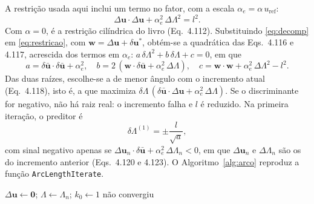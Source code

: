\documentclass[11pt,a4paper]{article}
\numberwithin{equation}{section}
\begin{document}
A restrição usada aqui inclui um termo no fator, com a escala $\alpha_e = \alpha\,u_{\mathrm{ref}}$:
\begin{equation}\label{eq:restricao}
\Delta\mathbf{u}\cdot\Delta\mathbf{u} + \alpha_e^2\,\Delta\Lambda^2 = l^2 .
\end{equation}
Com $\alpha = 0$, é a restrição cilíndrica do livro (Eq.~4.112). Substituindo \eqref{eq:decomp} em \eqref{eq:restricao}, com $\mathbf{w} = \Delta\mathbf{u} + \delta\mathbf{u}^{*}$, obtém-se a quadrática das Eqs.~4.116 e 4.117, acrescida dos termos em $\alpha_e$: $a\,\delta\Lambda^2 + b\,\delta\Lambda + c = 0$, em que
\begin{equation}
a = \delta\bar{\mathbf{u}}\cdot\delta\bar{\mathbf{u}} + \alpha_e^2,\quad
b = 2\,(\mathbf{w}\cdot\delta\bar{\mathbf{u}} + \alpha_e^2\,\Delta\Lambda),\quad
c = \mathbf{w}\cdot\mathbf{w} + \alpha_e^2\,\Delta\Lambda^2 - l^2 .
\end{equation}
Das duas raízes, escolhe-se a de menor ângulo com o incremento atual (Eq.~4.118), isto é, a que maximiza $\delta\Lambda\,(\delta\bar{\mathbf{u}}\cdot\Delta\mathbf{u} + \alpha_e^2\,\Delta\Lambda)$. Se o discriminante for negativo, não há raiz real: o incremento
falha e $l$ é reduzido. Na primeira iteração, o preditor é
\begin{equation}
\delta\Lambda^{(1)} = \pm\frac{l}{\sqrt{a}},
\end{equation}
com sinal negativo apenas se $\Delta\mathbf{u}_n\cdot\delta\bar{\mathbf{u}} + \alpha_e^2\,\Delta\Lambda_n < 0$, em que $\Delta\mathbf{u}_n$ e $\Delta\Lambda_n$ são os do incremento anterior (Eqs.~4.120 e 4.123). O Algoritmo~\ref{alg:arco} reproduz a função
\texttt{ArcLengthIterate}.

\begin{algorithm}[htbp]
\caption{Um incremento de arc-length (\texttt{ArcLengthIterate})}\label{alg:arco}
$\Delta\mathbf{u}\leftarrow\mathbf{0}$; $\Lambda\leftarrow\Lambda_n$; $k_0\leftarrow 1$\;
\Return não convergiu\;
\end{algorithm}
\end{document}
